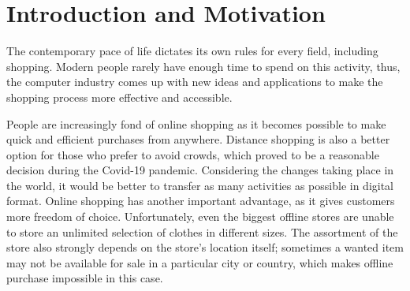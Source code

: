 \documentclass[a4paper]{report}
\begin{document}
\tableofcontents{}






\clearpage

\chapter{Introduction and Motivation}




%

\qquad The contemporary pace of life dictates its own rules for every field, including shopping. Modern people rarely have enough time to spend on this activity, thus, the computer industry comes up with new ideas and applications to make the shopping process more effective and accessible. 


\bigskip People are increasingly fond of online shopping as it becomes possible to make quick and efficient purchases from anywhere. Distance shopping is also a better option for those who prefer to avoid crowds, which proved to be a reasonable decision during the Covid-19 pandemic. Considering the changes taking place in the world, it would be better to transfer as many activities as possible in digital format. Online shopping has another important advantage, as it gives customers more freedom of choice. Unfortunately, even the biggest offline stores are unable to store an unlimited selection of clothes in different sizes. The assortment of the store also strongly depends on the store’s location itself; sometimes a wanted item may not be available for sale in a particular city or country, which makes offline purchase impossible in this case. 
\end{document}
